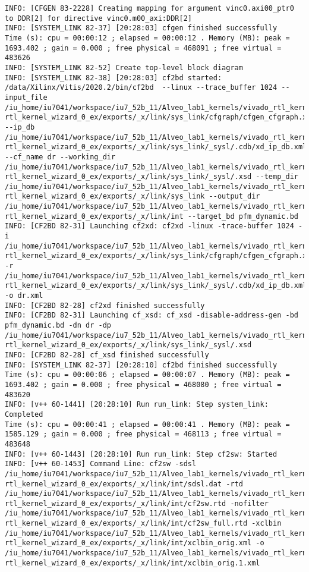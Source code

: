 \begin{lstlisting}[label=code:log_file, caption=Содержимое log-файла, basicstyle=\tiny]
INFO: [CFGEN 83-2228] Creating mapping for argument vinc0.axi00_ptr0 to DDR[2] for directive vinc0.m00_axi:DDR[2]
INFO: [SYSTEM_LINK 82-37] [20:28:03] cfgen finished successfully
Time (s): cpu = 00:00:12 ; elapsed = 00:00:12 . Memory (MB): peak = 1693.402 ; gain = 0.000 ; free physical = 468091 ; free virtual = 483626
INFO: [SYSTEM_LINK 82-52] Create top-level block diagram
INFO: [SYSTEM_LINK 82-38] [20:28:03] cf2bd started: /data/Xilinx/Vitis/2020.2/bin/cf2bd  --linux --trace_buffer 1024 --input_file /iu_home/iu7041/workspace/iu7_52b_11/Alveo_lab1_kernels/vivado_rtl_kernel/  rtl_kernel_wizard_0_ex/exports/_x/link/sys_link/cfgraph/cfgen_cfgraph.xml --ip_db /iu_home/iu7041/workspace/iu7_52b_11/Alveo_lab1_kernels/vivado_rtl_kernel/  rtl_kernel_wizard_0_ex/exports/_x/link/sys_link/_sysl/.cdb/xd_ip_db.xml --cf_name dr --working_dir /iu_home/iu7041/workspace/iu7_52b_11/Alveo_lab1_kernels/vivado_rtl_kernel/  rtl_kernel_wizard_0_ex/exports/_x/link/sys_link/_sysl/.xsd --temp_dir /iu_home/iu7041/workspace/iu7_52b_11/Alveo_lab1_kernels/vivado_rtl_kernel/  rtl_kernel_wizard_0_ex/exports/_x/link/sys_link --output_dir /iu_home/iu7041/workspace/iu7_52b_11/Alveo_lab1_kernels/vivado_rtl_kernel/  rtl_kernel_wizard_0_ex/exports/_x/link/int --target_bd pfm_dynamic.bd
INFO: [CF2BD 82-31] Launching cf2xd: cf2xd -linux -trace-buffer 1024 -i /iu_home/iu7041/workspace/iu7_52b_11/Alveo_lab1_kernels/vivado_rtl_kernel/  rtl_kernel_wizard_0_ex/exports/_x/link/sys_link/cfgraph/cfgen_cfgraph.xml -r /iu_home/iu7041/workspace/iu7_52b_11/Alveo_lab1_kernels/vivado_rtl_kernel/  rtl_kernel_wizard_0_ex/exports/_x/link/sys_link/_sysl/.cdb/xd_ip_db.xml -o dr.xml
INFO: [CF2BD 82-28] cf2xd finished successfully
INFO: [CF2BD 82-31] Launching cf_xsd: cf_xsd -disable-address-gen -bd pfm_dynamic.bd -dn dr -dp /iu_home/iu7041/workspace/iu7_52b_11/Alveo_lab1_kernels/vivado_rtl_kernel/  rtl_kernel_wizard_0_ex/exports/_x/link/sys_link/_sysl/.xsd
INFO: [CF2BD 82-28] cf_xsd finished successfully
INFO: [SYSTEM_LINK 82-37] [20:28:10] cf2bd finished successfully
Time (s): cpu = 00:00:06 ; elapsed = 00:00:07 . Memory (MB): peak = 1693.402 ; gain = 0.000 ; free physical = 468080 ; free virtual = 483620
INFO: [v++ 60-1441] [20:28:10] Run run_link: Step system_link: Completed
Time (s): cpu = 00:00:41 ; elapsed = 00:00:41 . Memory (MB): peak = 1585.129 ; gain = 0.000 ; free physical = 468113 ; free virtual = 483648
INFO: [v++ 60-1443] [20:28:10] Run run_link: Step cf2sw: Started
INFO: [v++ 60-1453] Command Line: cf2sw -sdsl /iu_home/iu7041/workspace/iu7_52b_11/Alveo_lab1_kernels/vivado_rtl_kernel/  rtl_kernel_wizard_0_ex/exports/_x/link/int/sdsl.dat -rtd /iu_home/iu7041/workspace/iu7_52b_11/Alveo_lab1_kernels/vivado_rtl_kernel/  rtl_kernel_wizard_0_ex/exports/_x/link/int/cf2sw.rtd -nofilter /iu_home/iu7041/workspace/iu7_52b_11/Alveo_lab1_kernels/vivado_rtl_kernel/  rtl_kernel_wizard_0_ex/exports/_x/link/int/cf2sw_full.rtd -xclbin /iu_home/iu7041/workspace/iu7_52b_11/Alveo_lab1_kernels/vivado_rtl_kernel/  rtl_kernel_wizard_0_ex/exports/_x/link/int/xclbin_orig.xml -o /iu_home/iu7041/workspace/iu7_52b_11/Alveo_lab1_kernels/vivado_rtl_kernel/  rtl_kernel_wizard_0_ex/exports/_x/link/int/xclbin_orig.1.xml

\end{lstlisting}
